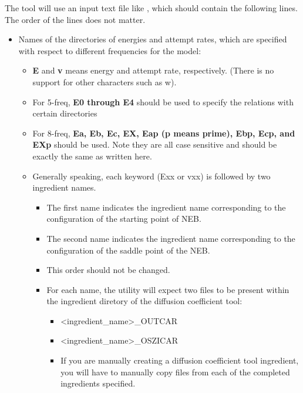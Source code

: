 \documentclass[letterpaper,10pt,english]{sphinxmanual}
\begin{document}
The tool will use an input text file like , which should contain the following lines. The order of the lines does not matter.
\begin{itemize}
\item {} 
Names of the directories of energies and attempt rates, which are specified with respect to different frequencies for the model:
\begin{itemize}
\item {} 
\textbf{E} and \textbf{v} means energy and attempt rate, respectively. (There is no support for other characters such as w).

\item {} 
For 5-freq, \textbf{E0 through E4} should be used to specify the relations with certain directories

\item {} 
For 8-freq, \textbf{Ea, Eb, Ec, EX, Eap (p means prime), Ebp, Ecp, and EXp} should be used. Note they are all case sensitive and should be exactly the same as written here.

\item {} 
Generally speaking, each keyword (Exx or vxx) is followed by two ingredient names.
\begin{itemize}
\item {} 
The first name indicates the ingredient name corresponding to the configuration of the starting point of NEB.

\item {} 
The second name indicates the ingredient name corresponding to the configuration of the saddle point of the NEB.

\item {} 
This order should not be changed.

\item {} 
For each name, the utility will expect two files to be present within the ingredient diretory of the diffusion coefficient tool:
\begin{itemize}
\item {} 
\textless{}ingredient\_name\textgreater{}\_OUTCAR

\item {} 
\textless{}ingredient\_name\textgreater{}\_OSZICAR

\item {} 
If you are manually creating a diffusion coefficient tool ingredient, you will have to manually copy files from each of the completed ingredients specified.


\end{itemize}
\end{itemize}
\end{itemize}
\end{itemize}
\end{document}
